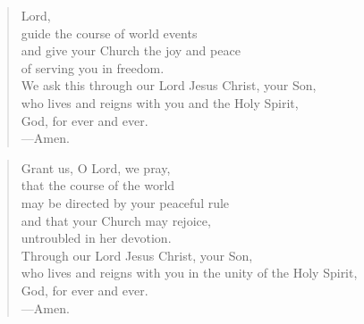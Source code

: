 \prayer

\setlength{\leftmargini}{\prayerleftmargini}

\begin{verse}
Lord,\\
guide the course of world events\\
and give your Church the joy and peace\\
of serving you in freedom.\\
We ask this through our Lord Jesus Christ, your Son,\\
who lives and reigns with you and the Holy Spirit,\\
God, for ever and ever.\\
{\color{red}---\thinspace}Amen.
\end{verse}


\begin{verse}
Grant us, O Lord, we pray,\\
that the course of the world\\
may be directed by your peaceful rule\\
and that your Church may rejoice,\\
untroubled in her devotion.\\
Through our Lord Jesus Christ, your Son,\\
who lives and reigns with you in the unity of the Holy Spirit,\\
God, for ever and ever.\\
{\color{red}---\thinspace}Amen.
\end{verse}

\setlength{\leftmargini}{\defleftmargini}